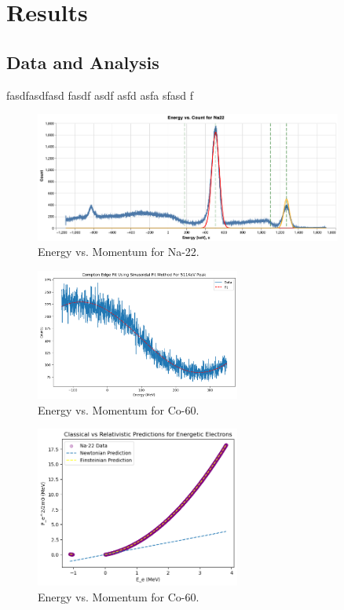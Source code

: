 \documentclass[12pt]{article}
\begin{document}
\section{Results}
        \subsection{Data and Analysis}
        fasdfasdfasd fasdf asdf asfd asfa sfasd f

\newpage
\vfill

        \begin{figure}[h!]
                \centering
                \includegraphics[width=0.9\textwidth]{./img/plots/graph2.png}
                \caption{Energy vs. Momentum for Na-22.}
        \end{figure}

        \begin{figure}[h!]
                \centering
                \includegraphics[width=0.6\textwidth]{./img/plots/Graph3.png}
                \caption{Energy vs. Momentum for Co-60.}
        \end{figure}
        
        \begin{figure}[h!]
                \centering
                \includegraphics[width=0.6\textwidth]{./img/plots/Graph1.png}
                \caption{Energy vs. Momentum for Co-60.}
        \end{figure}
                        
\end{document}
